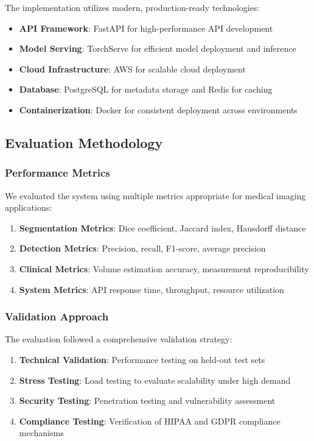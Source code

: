 \documentclass[12pt,a4paper]{article}
\begin{document}
The implementation utilizes modern, production-ready technologies:

\begin{itemize}
    \item \textbf{API Framework}: FastAPI for high-performance API development
    \item \textbf{Model Serving}: TorchServe for efficient model deployment and inference
    \item \textbf{Cloud Infrastructure}: AWS for scalable cloud deployment
    \item \textbf{Database}: PostgreSQL for metadata storage and Redis for caching
    \item \textbf{Containerization}: Docker for consistent deployment across environments
\end{itemize}

\subsection{Evaluation Methodology}

\subsubsection{Performance Metrics}

We evaluated the system using multiple metrics appropriate for medical imaging applications:

\begin{enumerate}
    \item \textbf{Segmentation Metrics}: Dice coefficient, Jaccard index, Hausdorff distance
    \item \textbf{Detection Metrics}: Precision, recall, F1-score, average precision
    \item \textbf{Clinical Metrics}: Volume estimation accuracy, measurement reproducibility
    \item \textbf{System Metrics}: API response time, throughput, resource utilization
\end{enumerate}

\subsubsection{Validation Approach}

The evaluation followed a comprehensive validation strategy:

\begin{enumerate}
    \item \textbf{Technical Validation}: Performance testing on held-out test sets
    \item \textbf{Stress Testing}: Load testing to evaluate scalability under high demand
    \item \textbf{Security Testing}: Penetration testing and vulnerability assessment
    \item \textbf{Compliance Testing}: Verification of HIPAA and GDPR compliance mechanisms
\end{enumerate}
\end{document}
